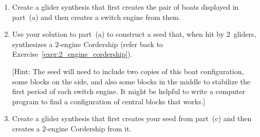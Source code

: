 \begin{multicols}{2}
\begin{problemstar}
\begin{enumerate}[label=\bf\color{ocre}(\alph*)]
			\item {} Create a glider synthesis that first creates the pair of boats displayed in part~(a) and then creates a switch engine from them.
			
			\item {} Use your solution to part~(a) to construct a seed that, when hit by $2$~gliders, synthesizes a $2$-engine Cordership (refer back to Exercise~\ref{exer:2_engine_cordership}).
			
			[Hint: The seed will need to include two copies of this boat configuration, some blocks on the side, and also some blocks in the middle to stabilize the first period of each switch engine. It might be helpful to write a computer program to find a configuration of central blocks that works.]
			
			\item {} Create a glider synthesis that first creates your seed from part~(c) and then creates a $2$-engine Cordership from it.
		\end{enumerate}
	\end{problemstar}
	
\end{multicols}
\normalsize\vspace*{0.01cm}\ifdefined\FORPRINTING{}\else%
\fi
